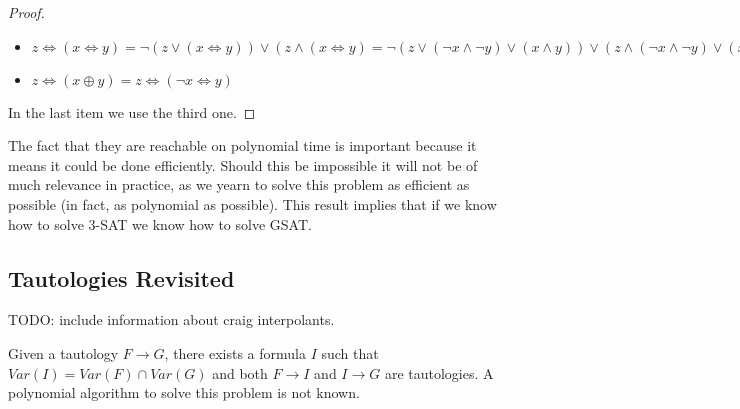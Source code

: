 \begin{proof}
\begin{itemize}
    \item $z \iff( x \iff y ) =  \neg ( z \vee ( x \iff y ) ) \vee (z \wedge ( x \iff y ) = \neg ( z \vee (\neg  x \wedge \neg  y) \vee (x \wedge y)) \vee (z \wedge(\neg  x \wedge \neg  y) \vee (x \wedge y))  )=(\neg  z \wedge \neg  (\neg  x \wedge \neg  y) \wedge \neg  (x \wedge y)) \vee (z \wedge(\neg  x \wedge \neg  y) \vee (x \wedge y))  )=(\neg  z \wedge  (x \vee  y) \wedge (\neg  x \vee \neg  y)) \vee (z \wedge(\neg  x \wedge \neg  y) \vee (x \wedge y))  )=z \vee ( \neg  x \wedge \neg  y) = (\neg x \vee \neg y \vee z) \wedge (\neg x \vee \neg z \vee y) \wedge (y \vee z \vee x) \wedge (y \vee \neg y \vee x) \wedge (\neg z \vee z \vee x) \wedge (\neg z \vee \neg y \vee x)$
      
    \item $z \iff( x \oplus y ) =  z \iff(\neg  x \iff y )  $	

    \end{itemize}
    In the last item we use the third one.
    
  \end{proof}

  The fact that they are reachable on polynomial time is important because it means it could be done efficiently. Should this be impossible it will not be of much relevance in practice, as we yearn to solve this problem as efficient as possible (in fact, as polynomial as possible). This result implies that if we know how to solve $3$-SAT we know how to solve GSAT.


  \subsection{Tautologies Revisited}

  TODO: include information about craig interpolants.
  \begin{proposition}
    Given a tautology $F \to G$, there exists a formula $I$ such that $Var(I) = Var(F)\cap Var(G)$ and both $F\to I$ and $I \to G$ are tautologies. A polynomial algorithm to solve this problem is not known. 
  \end{proposition}

